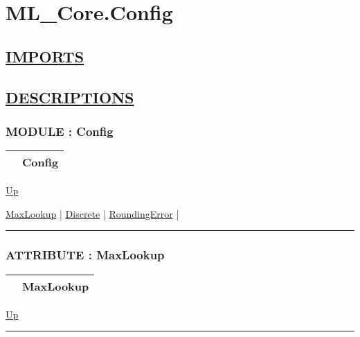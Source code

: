 \chapter*{ML\_Core.Config}
\hypertarget{ecldoc:toc:ML_Core.Config}{}

\section*{\underline{IMPORTS}}

\section*{\underline{DESCRIPTIONS}}
\subsection*{MODULE : Config}
\hypertarget{ecldoc:ML_Core.Config}{}

{\renewcommand{\arraystretch}{1.5}
\begin{tabularx}{\textwidth}{|>{\raggedright\arraybackslash}l|X|}
\hline
\hspace{0pt} & Config \\
\hline
\end{tabularx}
}

\hyperlink{ecldoc:toc:ML_Core}{Up}

\par


\hyperlink{ecldoc:ml_core.config.maxlookup}{MaxLookup}  |
\hyperlink{ecldoc:ml_core.config.discrete}{Discrete}  |
\hyperlink{ecldoc:ml_core.config.roundingerror}{RoundingError}  |

\rule{\textwidth}{0.4pt}

\subsection*{ATTRIBUTE : MaxLookup}
\hypertarget{ecldoc:ml_core.config.maxlookup}{}

{\renewcommand{\arraystretch}{1.5}
\begin{tabularx}{\textwidth}{|>{\raggedright\arraybackslash}l|X|}
\hline
\hspace{0pt} & MaxLookup \\
\hline
\end{tabularx}
}

\hyperlink{ecldoc:ML_Core.Config}{Up}

\par


\rule{\textwidth}{0.4pt}
